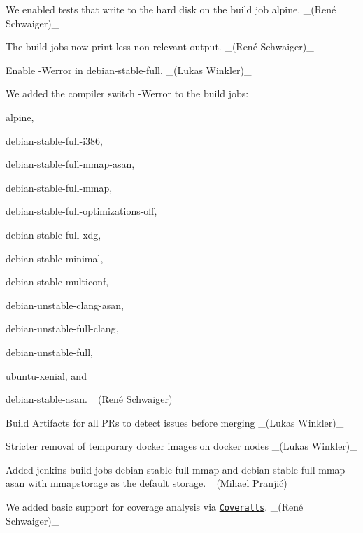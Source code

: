 \begin{DoxyItemize}
\item We enabled tests that write to the hard disk on the build job {\ttfamily alpine}. \+\_\+(René Schwaiger)\+\_\+
\item The build jobs now print less non-\/relevant output. \+\_\+(René Schwaiger)\+\_\+
\item Enable {\ttfamily -\/\+Werror} in {\ttfamily debian-\/stable-\/full}. \+\_\+(\+Lukas Winkler)\+\_\+
\item We added the compiler switch {\ttfamily -\/\+Werror} to the build jobs\+:
\begin{DoxyItemize}
\item {\ttfamily alpine},
\item {\ttfamily debian-\/stable-\/full-\/i386},
\item {\ttfamily debian-\/stable-\/full-\/mmap-\/asan},
\item {\ttfamily debian-\/stable-\/full-\/mmap},
\item {\ttfamily debian-\/stable-\/full-\/optimizations-\/off},
\item {\ttfamily debian-\/stable-\/full-\/xdg},
\item {\ttfamily debian-\/stable-\/minimal},
\item {\ttfamily debian-\/stable-\/multiconf},
\item {\ttfamily debian-\/unstable-\/clang-\/asan},
\item {\ttfamily debian-\/unstable-\/full-\/clang},
\item {\ttfamily debian-\/unstable-\/full},
\item {\ttfamily ubuntu-\/xenial}, and
\item {\ttfamily debian-\/stable-\/asan}. \+\_\+(René Schwaiger)\+\_\+
\end{DoxyItemize}
\item Build Artifacts for all PR\textquotesingle{}s to detect issues before merging \+\_\+(\+Lukas Winkler)\+\_\+
\item Stricter removal of temporary docker images on docker nodes \+\_\+(\+Lukas Winkler)\+\_\+
\item Added jenkins build jobs {\ttfamily debian-\/stable-\/full-\/mmap} and {\ttfamily debian-\/stable-\/full-\/mmap-\/asan} with {\ttfamily mmapstorage} as the default storage. \+\_\+(Mihael Pranjić)\+\_\+
\item We added basic support for coverage analysis via \href{http://coveralls.io}{\tt Coveralls}. \+\_\+(René Schwaiger)\+\_\+
\end{DoxyItemize}


